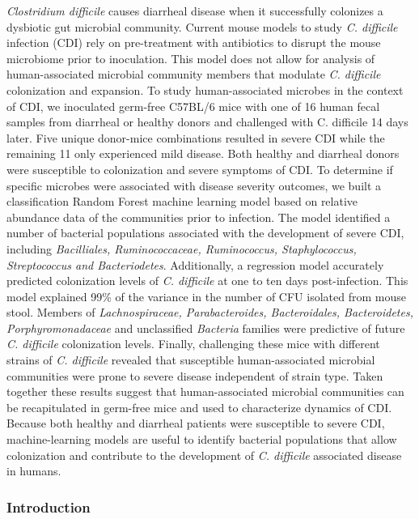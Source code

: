 \documentclass[11pt,]{article}
\begin{document}
\emph{Clostridium difficile} causes diarrheal disease when it
successfully colonizes a dysbiotic gut microbial community. Current
mouse models to study \emph{C. difficile} infection (CDI) rely on
pre-treatment with antibiotics to disrupt the mouse microbiome prior to
inoculation. This model does not allow for analysis of human-associated
microbial community members that modulate \emph{C. difficile}
colonization and expansion. To study human-associated microbes in the
context of CDI, we inoculated germ-free C57BL/6 mice with one of 16
human fecal samples from diarrheal or healthy donors and challenged with
C. difficile 14 days later. Five unique donor-mice combinations resulted
in severe CDI while the remaining 11 only experienced mild disease. Both
healthy and diarrheal donors were susceptible to colonization and severe
symptoms of CDI. To determine if specific microbes were associated with
disease severity outcomes, we built a classification Random Forest
machine learning model based on relative abundance data of the
communities prior to infection. The model identified a number of
bacterial populations associated with the development of severe CDI,
including \emph{Bacilliales, Ruminococcaceae, Ruminococcus,
Staphylococcus, Streptococcus and Bacteriodetes}. Additionally, a
regression model accurately predicted colonization levels of \emph{C.
difficile} at one to ten days post-infection. This model explained 99\%
of the variance in the number of CFU isolated from mouse stool. Members
of \emph{Lachnospiraceae, Parabacteroides, Bacteroidales, Bacteroidetes,
Porphyromonadaceae} and unclassified \emph{Bacteria} families were
predictive of future \emph{C. difficile} colonization levels. Finally,
challenging these mice with different strains of \emph{C. difficile}
revealed that susceptible human-associated microbial communities were
prone to severe disease independent of strain type. Taken together these
results suggest that human-associated microbial communities can be
recapitulated in germ-free mice and used to characterize dynamics of
CDI. Because both healthy and diarrheal patients were susceptible to
severe CDI, machine-learning models are useful to identify bacterial
populations that allow colonization and contribute to the development of
\emph{C. difficile} associated disease in humans.

\newpage

\subsubsection{Introduction}\label{introduction}
\end{document}

